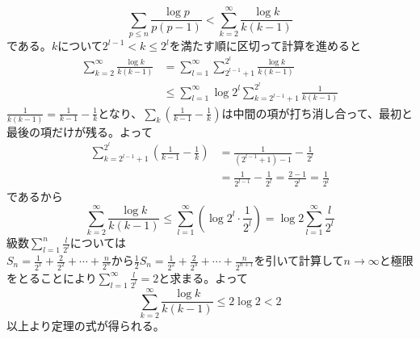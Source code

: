 \documentclass{jsarticle}
\begin{document}
\[\sum_{p\leq n}\frac{\log p}{p(p-1)}<\sum_{k=2}^{\infty}\frac{\log k}{k(k-1)}\]
である。\(k\)について\(2^{l-1}<k\leq2^{l}\)を満たす順に区切って計算を進めると
\begin{align*}
\sum_{k=2}^{\infty}\frac{\log k}{k(k-1)}&=\sum_{l=1}^{\infty}\sum_{2^{l-1}+1}^{2^l}\frac{\log k}{k(k-1)}\\
&\leq\sum_{l=1}^{\infty}\log2^{l}\sum_{k=2^{l-1}+1}^{2^l}\frac{1}{k(k-1)}
\end{align*}
\(\frac{1}{k(k-1)}=\frac{1}{k-1}-\frac{1}{k}\)となり、\(\sum_{k}\left(\frac{1}{k-1}-\frac{1}{k}\right)\)は中間の項が打ち消し合って、最初と最後の項だけが残る。よって
\begin{align*}
\sum_{k=2^{l-1}+1}^{2^{l}}\left(\frac{1}{k-1}-\frac{1}{k}\right)&=\frac{1}{(2^{l-1}+1)-1}-\frac{1}{2^{l}}\\
&=\frac{1}{2^{l-1}}-\frac{1}{2^l}=\frac{2-1}{2^{l}}=\frac{1}{2^l}
\end{align*}
であるから
\[\sum_{k=2}^{\infty}\frac{\log k}{k(k-1)}\leq\sum_{l=1}^{\infty}\left(\log 2^{l}\cdot\frac{1}{2^l}\right)=\log2\sum_{l=1}^{\infty}\frac{l}{2^{l}}\]
級数\(\displaystyle\sum_{l=1}^{n}\frac{l}{2^{l}}\)については\\
\(S_{n}=\frac{1}{2^1}+\frac{2}{2^2}+\cdots+\frac{n}{2^{n}}\)から\(\frac{1}{2}S_{n}=\frac{1}{2^2}+\frac{2}{2^{3}}+\cdots+\frac{n}{2^{n+1}}\)を引いて計算して\(n\to\infty\)と極限をとることにより\(\displaystyle\sum_{l=1}^{\infty}\frac{l}{2^{l}}=2\)と求まる。よって
\[\sum_{k=2}^{\infty}\frac{\log k}{k(k-1)}\leq2\log2<2\]
以上より定理の式が得られる。
              
              
              
              
              
              
              
              
              
              
              
              
     
     
     
     
     
     
     
     
 
 
\end{document}
